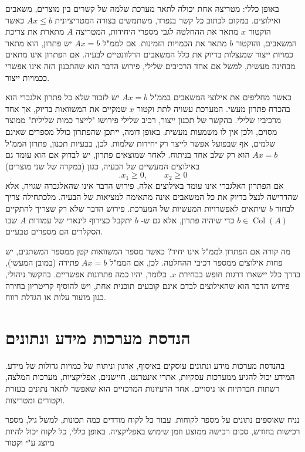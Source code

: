 \documentclass[12pt]{report}
\theoremstyle{plain}
\theoremstyle{definition}
\newcommand{\0}{\mathbf{0}}
\DeclareMathOperator{\Col}{Col}
\begin{document}
באופן כללי: מטריצה אחת יכולה לתאר מערכת שלמה של קשרים בין מוצרים, משאבים ואילוצים. במקום לכתוב כל קשר בנפרד, משתמשים בצורה המטריציונית
$A x \leq b$
כאשר הוקטור
$x$
מתאר את ההחלטה לגבי מספרי היחידות, המטריצה
$A$
מתארת את צריכת המשאבים, והוקטור
$b$
מתאר את הכמויות הזמינות. אם לממ"ל
$Ax=b$
יש פתרון, הוא מתאר כמויות ייצור שמנצלות בדיוק את כלל המשאבים הרלוונטיים לבעיה.
אם הפתרון אינו מתאים מבחינה מעשית, למשל אם אחד הרכיבים שלילי, פירוש הדבר הוא שהתכנון הזה אינו אפשרי ככמויות ייצור.

כאשר מחליפים את אילוצי המשאבים בממ"ל
$A x = b$
יש לזכור שלא כל פתרון אלגברי הוא בהכרח פתרון מעשי.
המערכת עשויה לתת וקטור
$x$
שמקיים את המשוואות בדיוק, אך אחד מרכיביו שלילי.
בהקשר של תכנון ייצור, רכיב שלילי פירושו "לייצר כמות שלילית" ממוצר מסוים, ולכן אין לו משמעות מעשית.
באופן דומה, ייתכן שהפתרון כולל מספרים שאינם שלמים, אף שבפועל אפשר לייצר רק יחידות שלמות.
לכן, בבעיות תכנון, פתרון הממ"ל
$Ax=b$
הוא רק שלב אחד בניתוח.
לאחר שמוצאים פתרון, יש לבדוק אם הוא עומד גם באילוצים המעשיים של הבעיה, כגון (במקרה של שני מוצרים)
$$
.x_1 \geq 0,
\qquad x_2 \geq 0
$$
אם הפתרון האלגברי אינו עומד באילוצים אלה, פירוש הדבר אינו שהאלגברה שגויה, אלא שהדרישה לנצל בדיוק את כל המשאבים אינה מתאימה למציאות של הבעיה.
מלכתחילה צריך לבחור
$b$
שיתאים לאפשרויות המעשיות של המערכת. פירוש הדבר שלא רק שצריך להתקיים
$b\in\Col(A)$
כדי שיהיה פתרון, אלא גם ש-
$b$
יתקבל כצירוף לינארי של עמודות
$A$
שבו הסקלרים הם מספרים טבעיים.

מה קורה אם הפתרון לממ"ל אינו יחיד? כאשר מספר המשוואות קטן ממספר המשתנים, יש פחות אילוצים ממספר רכיבי ההחלטה.
לכן, אם הממ"ל
$A x = b$
פתירה (במובן המעשי), בדרך כלל יישארו דרגות חופש בבחירת
$x$.
כלומר, יהיו כמה פתרונות אפשריים.
בהקשר ניהולי, פירוש הדבר הוא שהאילוצים לבדם אינם קובעים תוכנית אחת, ויש להוסיף קריטריון בחירה כגון מזעור עלות או הגדלת רווח.

\section{הנדסת מערכות מידע ונתונים}

בהנדסת מערכות מידע ונתונים עוסקים באיסוף, ארגון וניתוח של כמויות גדולות של מידע.
המידע יכול להגיע ממערכות עסקיות, אתרי אינטרנט, חיישנים, אפליקציות, מערכות המלצה, רשתות חברתיות או ניסויים.
אחד הרעיונות המרכזיים הוא שאפשר לתאר נתונים בעזרת וקטורים ומטריצות.

נניח שאוספים נתונים על מספר לקוחות.
עבור כל לקוח מודדים כמה תכונות, למשל גיל, מספר רכישות בחודש, סכום רכישה ממוצע וזמן שימוש באפליקציה. באופן כללי, כל לקוח יכול להיות מיוצג ע"י וקטור
\end{document}

